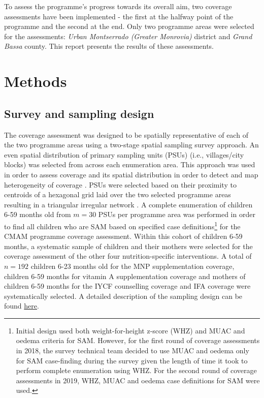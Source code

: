 \documentclass[12pt,a4paper]{article}
\let\rmarkdownfootnote\footnote%
\def\footnote{\protect\rmarkdownfootnote}
\begin{document}
To assess the programme's progress towards its overall aim, two coverage assessments have been implemented - the first at the halfway point of the programme and the second at the end. Only two programme areas were selected for the assessments: \emph{Urban Montserrado (Greater Monrovia)} district and \emph{Grand Bassa} county. This report presents the results of these assessments.

\hypertarget{methods}{%
\section{Methods}\label{methods}}

\hypertarget{sample-design}{%
\subsection{Survey and sampling design}\label{sample-design}}

The coverage assessment was designed to be spatially representative of each of the two programme areas using a two-stage spatial sampling survey approach. An even spatial distribution of primary sampling units (PSUs) (i.e., villages/city blocks) was selected from across each enumeration area. This approach was used in order to assess coverage and its spatial distribution in order to detect and map heterogeneity of coverage \citep[\citet{Diggle:2014tk}]{Elliott:2004cg}. PSUs were selected based on their proximity to centroids of a hexagonal grid laid over the two selected programme areas resulting in a triangular irregular network \citep{Isaaks:1989uk, Elliot:2000vs}. A complete enumeration of children 6-59 months old from \(m = 30\) PSUs per programme area was performed in order to find all children who are SAM based on specified case definitions\footnote{Initial design used both weight-for-height z-score (WHZ) and MUAC and oedema criteria for SAM. However, for the first round of coverage assessments in 2018, the survey technical team decided to use MUAC and oedema only for SAM case-finding during the survey given the length of time it took to perform complete enumeration using WHZ. For the second round of coverage assessments in 2019, WHZ, MUAC and oedema case definitions for SAM were used.} for the CMAM programme coverage assessment. Within this cohort of children 6-59 months, a systematic sample of children and their mothers were selected for the coverage assessment of the other four nutrition-specific interventions. A total of \(n = 192\) children 6-23 months old for the MNP supplementation coverage, children 6-59 months for vitamin A supplementation coverage and mothers of children 6-59 months for the IYCF counselling coverage and IFA coverage were systematically selected. A detailed description of the sampling design can be found \href{https://validmeasures.org/liberiaS3M/}{here}.
\end{document}
